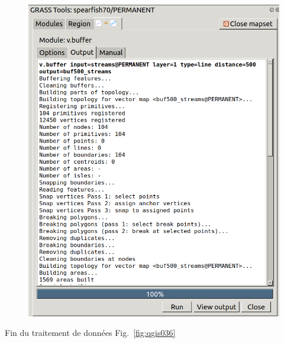 \begin{figure}[htbp]
   \centering
   \includegraphics[scale=0.3]{qgis035.png}
   \caption{}
   \label{fig:qgis035}
\end{figure}

Fin du traitement de donn\'ees Fig.~\ref{fig:qgis036}

